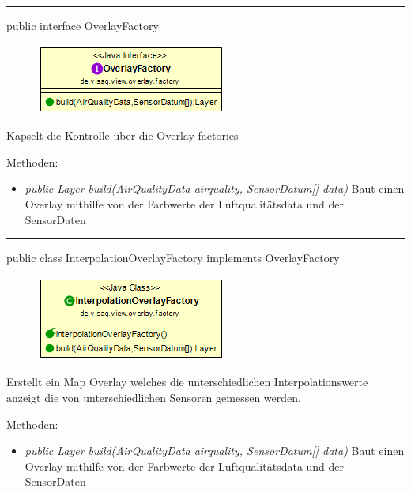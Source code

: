 
\rule{\textwidth}{0.4pt} 
public interface OverlayFactory 

\begin{minipage}{0.3\textwidth}
    \begin{figure}[H]
        \includegraphics[scale = 0.5
        ]{media/frontend/view/de.view.overlay.factory/OverlayFactory_Class.png}
    \end{figure}
    \end{minipage} \hfill
    \begin{minipage}{0.6\textwidth}
Kapselt die Kontrolle über die Overlay factories
\end{minipage}

Methoden:
\begin{itemize} 
    \item \emph{public Layer build(AirQualityData airquality, SensorDatum[] data)}  Baut einen Overlay mithilfe von der Farbwerte der Luftqualitätsdata und der SensorDaten
\end{itemize}

\rule{\textwidth}{0.4pt} 
public class InterpolationOverlayFactory implements OverlayFactory

\begin{minipage}{0.3\textwidth}
    \begin{figure}[H]
        \includegraphics[scale = 0.5]{media/frontend/view/de.view.overlay.factory/InterpolationOverlayFactory_Class.png}
    \end{figure}
    \end{minipage} \hfill
    \begin{minipage}{0.6\textwidth}
Erstellt ein Map Overlay welches die unterschiedlichen Interpolationswerte anzeigt die von unterschiedlichen Sensoren gemessen werden.
\end{minipage}

Methoden:
\begin{itemize} 
    \item \emph{public Layer build(AirQualityData airquality, SensorDatum[] data)}  Baut einen Overlay mithilfe von der Farbwerte der Luftqualitätsdata und der SensorDaten
\end{itemize}

